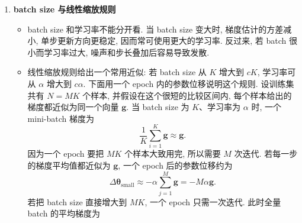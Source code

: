 \documentclass{../nndlcourse}
\begin{document}
\begin{enumerate}
\begin{itemize}
      \[
        \mathbb{E}[\boldsymbol{g}_t]
        =
        \nabla_{\boldsymbol{\theta}}\hat{\mathcal{R}}_D(\boldsymbol{\theta}_t).
      \]
      因此, batch size 主要改变的是梯度估计的方差, 而不是其期望.
      \item 用一个坐标上的随机梯度 $X_1,\dots,X_B$ 作直观说明. 若它们近似独立同分布, 均值为 $\mu$, 方差为 $\sigma^2$, 则 batch 平均梯度 $\bar{X}=\frac{1}{B}\sum_i X_i$ 满足
      \[
        \mathbb{E}[\bar{X}]=\mu,
        \qquad
        \operatorname{Var}(\bar{X})=\frac{\sigma^2}{B}.
      \]
      这解释了为什么 batch 越大, 梯度曲线通常越平滑; batch 越小, 噪声越强, 训练曲线越容易振荡.
      \item 一个 epoch 表示训练集样本大致被使用一遍. 若训练集大小为 $N$, batch size 为 $B$, 则每个 epoch 约包含
      \[
        \left\lceil \frac{N}{B}\right\rceil
      \]
      次参数更新. 因此, 按 iteration 比较时, 大 batch 的每一步更稳定; 按 epoch 比较时, 小 batch 在同样样本遍历次数内会更新更多步. 如果不同 batch size 还配了不同学习率, 图上的训练曲线就不能被当作严格控制变量实验来解释.
      \item batch size 的选择通常需要折中. 较大 batch 能提高 GPU 利用率, 也允许使用较大学习率, 但每个 epoch 的更新次数更少, 梯度噪声更小, 有时会削弱探索性或泛化表现. 较小 batch 噪声更强, 可能带来类似正则化的效果, 但硬件效率和训练稳定性可能下降.
    \end{itemize}
  \item \textbf{batch size 与线性缩放规则}
    \begin{itemize}
      \item batch size 和学习率不能分开看. 当 batch size 变大时, 梯度估计的方差减小, 单步更新方向更稳定, 因而常可使用更大的学习率. 反过来, 若 batch 很小而学习率过大, 噪声和步长叠加后容易导致发散.
      \item 线性缩放规则给出一个常用近似: 若 batch size 从 $K$ 增大到 $cK$, 学习率可从 $\alpha$ 增大到 $c\alpha$. 下面用一个 epoch 内的参数位移说明这个规则. 设训练集共有 $N=MK$ 个样本, 并假设在这个很短的比较区间内, 每个样本给出的梯度都近似为同一个向量 $\boldsymbol{g}$. 当 batch size 为 $K$、学习率为 $\alpha$ 时, 一个 mini-batch 梯度为
      \[
        \frac{1}{K}\sum_{i=1}^{K}\boldsymbol{g}
        \approx
        \boldsymbol{g}.
      \]
      因为一个 epoch 要把 $MK$ 个样本大致用完, 所以需要 $M$ 次迭代. 若每一步的梯度平均值都近似为 $\boldsymbol{g}$, 一个 epoch 后的参数位移约为
      \[
        \Delta\boldsymbol{\theta}_{\mathrm{small}}
        \approx
        -\alpha\sum_{j=1}^{M}\boldsymbol{g}
        =
        -M\alpha\boldsymbol{g}.
      \]
      若把 batch size 直接增大到 $MK$, 一个 epoch 只需一次迭代. 此时全量 batch 的平均梯度为

\end{itemize}
\end{enumerate}
\end{document}
